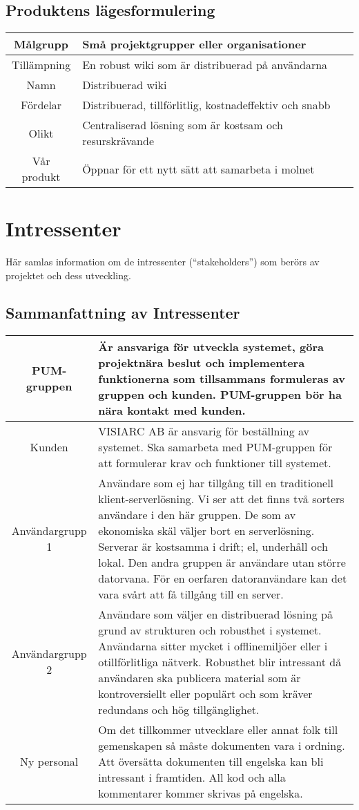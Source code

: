 \subsection{Produktens lägesformulering} %
\begin{tabular}{|c|m{15 cm}|}
\hline
Målgrupp & Små projektgrupper eller organisationer\\
\hline
Tillämpning & En robust wiki som är distribuerad på användarna \\
\hline
Namn & Distribuerad wiki  \\
\hline 
Fördelar & Distribuerad, tillförlitlig, kostnadeffektiv och snabb \\
\hline
Olikt & Centraliserad lösning som är kostsam och resurskrävande \\
\hline
Vår produkt & Öppnar för ett nytt sätt att samarbeta i molnet \\
\hline
\end{tabular}
\section{Intressenter}
Här samlas information om de intressenter (``stakeholders'') som berörs av projektet och dess utveckling.
\subsection{Sammanfattning av Intressenter}
\begin{tabular}{|c|m{14 cm}|}
\hline
PUM-gruppen & Är ansvariga för utveckla systemet, göra projektnära beslut och implementera funktionerna som tillsammans formuleras av gruppen och kunden. PUM-gruppen bör ha nära kontakt med kunden. \\ \hline
Kunden & VISIARC AB är ansvarig för beställning av systemet. Ska samarbeta med PUM-gruppen för att formulerar krav och funktioner till systemet. \\ \hline
Användargrupp 1 & Användare som ej har tillgång till en traditionell klient-serverlösning. Vi ser att det finns två sorters användare i den här gruppen. De som av ekonomiska skäl väljer bort en serverlösning. Serverar är kostsamma i drift; el, underhåll och lokal. Den andra gruppen är användare utan större datorvana. För en oerfaren datoranvändare kan det vara svårt att få tillgång till en server. \\ \hline
Användargrupp 2 & Användare som väljer en distribuerad lösning på grund av strukturen och robusthet i systemet. Användarna sitter mycket i offlinemiljöer eller i otillförlitliga nätverk. Robusthet blir intressant då användaren ska publicera material som är kontroversiellt eller populärt och som kräver redundans och hög tillgänglighet.\\ \hline
Ny personal & Om det tillkommer utvecklare eller annat folk till gemenskapen så måste dokumenten vara i ordning. Att översätta dokumenten till engelska kan bli intressant i framtiden. All kod och alla kommentarer kommer skrivas på engelska.  \\ \hline
\end{tabular}
